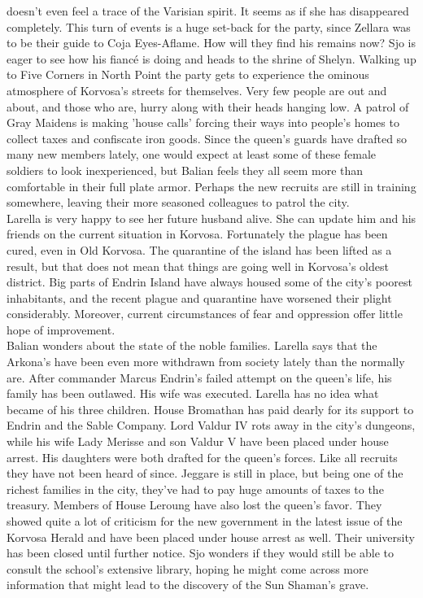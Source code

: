 doesn't even feel a trace of the Varisian spirit. It seems as if she has disappeared completely. This turn of events is a huge set-back for the party, since Zellara was to be their guide to Coja Eyes-Aflame. How will they find his remains now? Sjo is eager to see how his fianc\'e is doing and heads to the shrine of Shelyn. Walking up to Five Corners in North Point the party gets to experience the ominous atmosphere of Korvosa's streets for themselves. Very few people are out and about, and those who are, hurry along with their heads hanging low. A patrol of Gray Maidens is making 'house calls' forcing their ways into people's homes to collect taxes and confiscate iron goods. Since the queen's guards have drafted so many new members lately, one would expect at least some of these female soldiers to look inexperienced, but Balian feels they all seem more than comfortable in their full plate armor. Perhaps the new recruits are still in training somewhere, leaving their more seasoned colleagues to patrol the city.\\

Larella is very happy to see her future husband alive. She can update him and his friends on the current situation in Korvosa. Fortunately the plague has been cured, even in Old Korvosa. The quarantine of the island has been lifted as a result, but that does not mean that things are going well in Korvosa's oldest district. Big parts of Endrin Island have always housed some of the city's poorest inhabitants, and the recent plague and quarantine have worsened their plight considerably. Moreover, current circumstances of fear and oppression offer little hope of improvement.\\

Balian wonders about the state of the noble families. Larella says that the Arkona's have been even more withdrawn from society lately than the normally are. After commander Marcus Endrin's failed attempt on the queen's life, his family has been outlawed. His wife was executed. Larella has no idea what became of his three children. House Bromathan has paid dearly for its support to Endrin and the Sable Company. Lord Valdur IV rots away in the city's dungeons, while his wife Lady Merisse and son Valdur V have been placed under house arrest. His daughters were both drafted for the queen's forces. Like all recruits they have not been heard of since. Jeggare is still in place, but being one of the richest families in the city, they've had to pay huge amounts of taxes to the treasury. Members of House Leroung have also lost the queen's favor. They showed quite a lot of criticism for the new government in the latest issue of the Korvosa Herald and have been placed under house arrest as well. Their university has been closed until further notice. Sjo wonders if they would still be able to consult the school's extensive library, hoping he might come across more information that might lead to the discovery of the Sun Shaman's grave.\\

